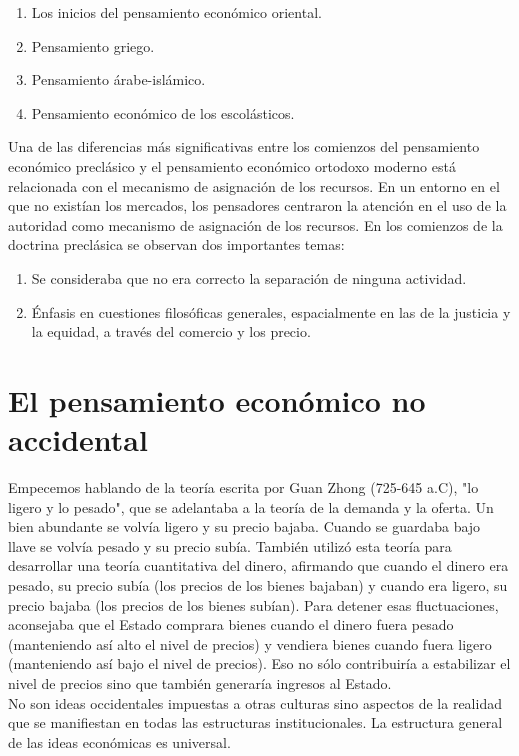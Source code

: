 \documentclass[10pt]{book}
\begin{document}
\begin{enumerate}[1.]
    \item Los inicios del pensamiento económico oriental.
    \item Pensamiento griego.
    \item Pensamiento árabe-islámico.
    \item Pensamiento económico de los escolásticos.
\end{enumerate}

Una de las diferencias más significativas entre los comienzos del pensamiento económico preclásico y el pensamiento económico ortodoxo moderno está relacionada con el mecanismo de asignación de los recursos. En un entorno en el que no existían los mercados, los pensadores centraron la atención en el uso de la autoridad como mecanismo de asignación de los recursos. En los comienzos de la doctrina preclásica se observan dos importantes temas:

\begin{enumerate}[1.]
    \item Se consideraba que no era correcto la separación de ninguna actividad.
    \item Énfasis en cuestiones filosóficas generales, espacialmente en las de la justicia y la equidad, a través del comercio y los precio.
\end{enumerate}

\section{El pensamiento económico no accidental}
Empecemos hablando de la teoría escrita por Guan Zhong (725-645 a.C), "lo ligero y lo pesado", que se adelantaba a la teoría de la demanda y la oferta. Un bien abundante se volvía ligero y su precio bajaba. Cuando se guardaba bajo llave se volvía pesado y su precio subía. También utilizó esta teoría para desarrollar una teoría cuantitativa del dinero, afirmando que cuando el dinero era pesado, su precio subía (los precios de los bienes bajaban) y cuando era ligero, su precio bajaba (los precios de los bienes subían). Para detener esas fluctuaciones, aconsejaba que el Estado comprara bienes cuando el
dinero fuera pesado (manteniendo así alto el nivel de precios) y vendiera bienes cuando fuera ligero (manteniendo así bajo el nivel de precios). Eso no sólo contribuiría a estabilizar el nivel de precios sino que también generaría ingresos al Estado.\\
No son ideas occidentales impuestas a otras culturas sino aspectos de la realidad que se manifiestan en todas las estructuras institucionales. La estructura general de las ideas económicas es universal.
\end{document}

